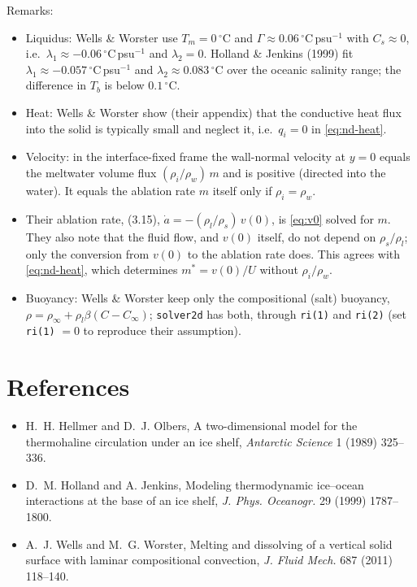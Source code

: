 \documentclass[11pt,a4paper]{article}
\begin{document}
Remarks:
\begin{itemize}
  \item Liquidus: Wells \& Worster use $T_m = 0$\,$^\circ$C and $\Gamma \approx 0.06$\,$^\circ$C\,psu$^{-1}$
        with $C_s\approx 0$, i.e.\ $\lambda_1\approx -0.06$\,$^\circ$C\,psu$^{-1}$ and $\lambda_2 = 0$.
        Holland \& Jenkins (1999) fit $\lambda_1\approx-0.057$\,$^\circ$C\,psu$^{-1}$ and
        $\lambda_2\approx 0.083$\,$^\circ$C over the oceanic salinity range; the difference in $T_b$ is
        below $0.1$\,$^\circ$C.
  \item Heat: Wells \& Worster show (their appendix) that the conductive heat flux into the solid is
        typically small and neglect it, i.e.\ $q_i=0$ in \eqref{eq:nd-heat}.
  \item Velocity: in the interface-fixed frame the wall-normal velocity at $y=0$ equals the meltwater
        volume flux $(\rho_i/\rho_w)\,m$ and is positive (directed into the water). It equals the
        ablation rate $m$ itself only if $\rho_i=\rho_w$.
  \item Their ablation rate, (3.15), $\dot a = -(\rho_l/\rho_s)\,v(0)$, is \eqref{eq:v0} solved for $m$.
        They also note that the fluid flow, and $v(0)$ itself, do not depend on $\rho_s/\rho_l$; only the
        conversion from $v(0)$ to the ablation rate does. This agrees with \eqref{eq:nd-heat}, which
        determines $m^* = v(0)/U$ without $\rho_i/\rho_w$.
  \item Buoyancy: Wells \& Worster keep only the compositional (salt) buoyancy,
        $\rho=\rho_\infty+\rho_l\beta(C-C_\infty)$; \texttt{solver2d} has both, through \texttt{ri(1)}
        and \texttt{ri(2)} (set \texttt{ri(1)} $=0$ to reproduce their assumption).
\end{itemize}

\section*{References}
\begin{itemize}
  \item H.~H. Hellmer and D.~J. Olbers, A two-dimensional model for the thermohaline circulation
        under an ice shelf, \emph{Antarctic Science} 1 (1989) 325--336.
  \item D.~M. Holland and A. Jenkins, Modeling thermodynamic ice--ocean interactions at the base of an
        ice shelf, \emph{J. Phys. Oceanogr.} 29 (1999) 1787--1800.
  \item A.~J. Wells and M.~G. Worster, Melting and dissolving of a vertical solid surface with laminar
        compositional convection, \emph{J. Fluid Mech.} 687 (2011) 118--140.
\end{itemize}
\end{document}

